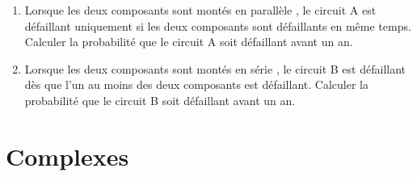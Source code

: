 \documentclass{cornouaille}
\begin{document}
\begin{exercice}
\medskip

\begin{enumerate}
\item Lorsque les deux composants sont montés \og en parallèle \fg, le circuit A est défaillant
uniquement si les deux composants sont défaillants en même temps. Calculer la probabilité
que le circuit A soit défaillant avant un an.
\item Lorsque les deux composants sont montés \og en série \fg, le circuit B est défaillant dès que l'un
au moins des deux composants est défaillant. Calculer la probabilité que le circuit B soit
défaillant avant un an.
\end{enumerate}
 \end{exercice}

\section{Complexes}
\end{document}
